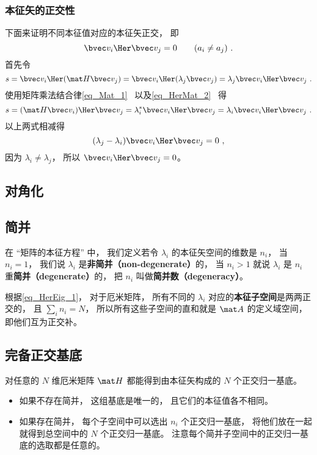 \subsubsection{本征矢的正交性}
下面来证明不同本征值对应的本征矢正交， 即
\begin{equation}\label{eq_HerEig_1}
\bvec v_i\Her \bvec v_j = 0 \qquad (a_i \ne a_j)~.
\end{equation}
首先令
\begin{equation}
s = \bvec v_i\Her (\mat H \bvec v_j) = \bvec v_i\Her (\lambda_j \bvec v_j) = \lambda_j \bvec v_i\Her \bvec v_j~.
\end{equation}
使用矩阵乘法结合律\autoref{eq_Mat_1}~ 以及\autoref{eq_HerMat_2}~ 得
\begin{equation}
s = (\mat H \bvec v_i)\Her \bvec v_j = \lambda_i^* \bvec v_i\Her \bvec v_j = \lambda_i \bvec v_i\Her \bvec v_j~.
\end{equation}
以上两式相减得 %
\begin{equation}
(\lambda_j - \lambda_i)\bvec v_i\Her \bvec v_j = 0~,
\end{equation}
因为 $\lambda_i \ne \lambda_j$， 所以 $\bvec v_i\Her \bvec v_j = 0$。

\subsection{对角化}

\subsection{简并}\label{sub_HerEig_1}
在 “矩阵的本征方程” 中， 我们定义若令 $\lambda_i$ 的本征矢空间的维数是 $n_i$， 当 $n_i = 1$， 我们说 $\lambda_i$ 是\textbf{非简并（non-degenerate）}的， 当 $n_i > 1$ 就说 $\lambda_i$ 是 $n_i$ 重\textbf{简并（degenerate）}的， 把 $n_i$ 叫做\textbf{简并数（degeneracy）}。

根据\autoref{eq_HerEig_1}， 对于厄米矩阵， 所有不同的 $\lambda_i$ 对应的\textbf{本征子空间}是两两正交的， 且 $\sum_i n_i = N$， 所以所有这些子空间的直和就是 $\mat A$ 的定义域空间， 即他们互为正交补。

\subsection{完备正交基底}
对任意的 $N$ 维厄米矩阵 $\mat H$ 都能得到由本征矢构成的 $N$ 个正交归一基底。
\begin{itemize}
\item 如果不存在简并， 这组基底是唯一的， 且它们的本征值各不相同。
\item 如果存在简并， 每个子空间中可以选出 $n_i$ 个正交归一基底， 将他们放在一起就得到总空间中的 $N$ 个正交归一基底。 注意每个简并子空间中的正交归一基底的选取都是任意的。
\end{itemize}

